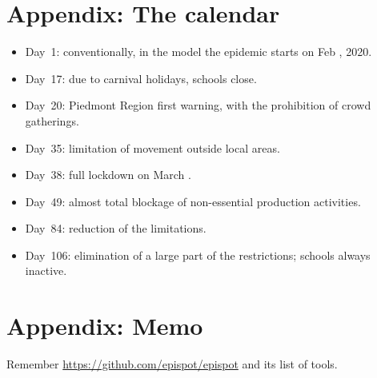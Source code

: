 \documentclass[graybox]{svmult}
\begin{document}
\section{Appendix: The calendar}
\label{appCalendar}

\begin{itemize}
\setlength{\itemsep}{0pt}

\item Day~1: conventionally, in the model the epidemic starts on Feb , 2020.

\item Day~17: due to carnival holidays, schools close.

\item Day~20: Piedmont Region first warning, with the prohibition of crowd gatherings.

\item Day~35: limitation of movement outside local areas.

\item Day~38: full lockdown on March .

\item Day~49: almost total blockage of non-essential production activities.

\item Day~84: reduction of the limitations.

\item Day~106: elimination of a large part of the restrictions; schools always inactive.

\end{itemize}


\section{Appendix: Memo}
\label{memo}

Remember \href{https://github.com/epispot/epispot}{https://github.com/epispot/epispot} and its list of tools.






\end{document}
